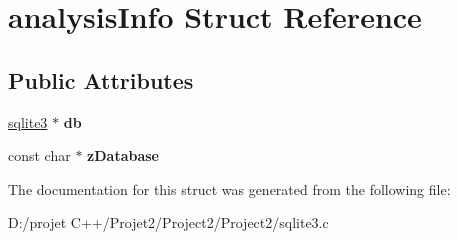 \hypertarget{structanalysis_info}{}\section{analysis\+Info Struct Reference}
\label{structanalysis_info}
\subsection*{Public Attributes}
\begin{DoxyCompactItemize}
\item 
\mbox{\label{structanalysis_info_a13108eadc55ffe73a8825fb91cc0f9b5}} 
\mbox{\hyperlink{structsqlite3}{sqlite3}} $\ast$ {\bfseries db}
\item 
\mbox{\label{structanalysis_info_accbe3c1f5613ffa13b9578e58a5d850a}} 
const char $\ast$ {\bfseries z\+Database}
\end{DoxyCompactItemize}


The documentation for this struct was generated from the following file\+:\begin{DoxyCompactItemize}
\item 
D\+:/projet C++/\+Projet2/\+Project2/\+Project2/sqlite3.\+c\end{DoxyCompactItemize}
